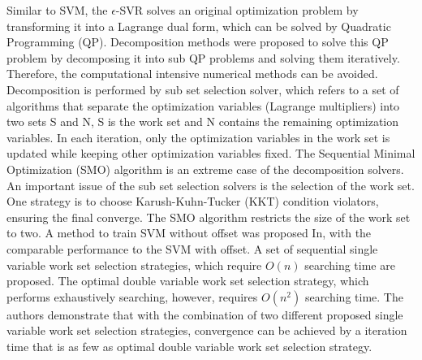 \documentclass[12pt, draftclsnofoot, onecolumn]{IEEEtran}
\begin{document}
\begin{spacing}{2}
Similar to SVM, the $\epsilon$-SVR solves an original optimization problem by transforming it into a Lagrange dual form, which can be solved by Quadratic Programming (QP). Decomposition methods were proposed to solve this QP problem by decomposing it into sub QP problems and solving them iteratively\cite{platt1999fast}. Therefore, the computational intensive numerical methods can be avoided. Decomposition is performed by sub set selection solver, which refers to a set of algorithms that separate the optimization variables (Lagrange multipliers) into two sets S and N, S is the work set and N contains the remaining optimization variables. In each iteration, only the optimization variables in the work set is updated while keeping other optimization variables fixed. The Sequential Minimal Optimization (SMO) algorithm\cite{platt1999fast} is an extreme case of the decomposition solvers. An important issue of the sub set selection solvers is the selection of the work set. One strategy is to choose Karush-Kuhn-Tucker (KKT) condition violators, ensuring the final converge\cite{osuna1997improved}. The SMO algorithm restricts the size of the work set to two. A method to train SVM without offset was proposed In\cite{steinwart2011training}, with the comparable performance to the SVM with offset. A set of sequential single variable work set selection strategies, which require $O(n)$ searching time are proposed. The optimal double variable work set selection strategy, which performs exhaustively searching, however, requires $O(n^{2})$ searching time. The authors demonstrate that with the combination of two different proposed single variable work set selection strategies, convergence can be achieved by a iteration time that is as few as optimal double variable work set selection strategy.


\end{spacing}
\end{document}
